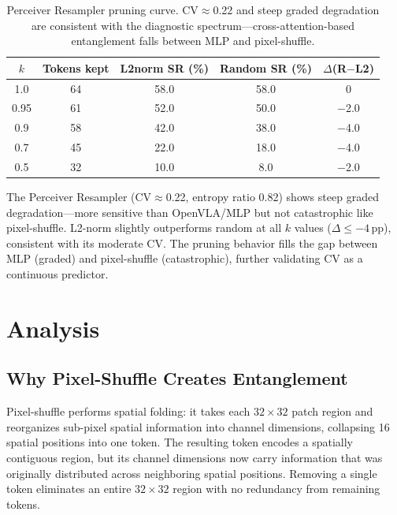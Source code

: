 \documentclass[10pt,letterpaper]{article}
\newcommand{\pp}{\,\text{pp}}
\begin{document}
\begin{table}[t]
\centering
\caption{Perceiver Resampler pruning curve. CV$\approx$0.22 and steep graded degradation are consistent with the diagnostic spectrum---cross-attention-based entanglement falls between MLP and pixel-shuffle.}
\label{tab:perceiver}
\small
\begin{tabular}{ccccc}
\toprule
$k$ & Tokens kept & L2norm SR (\%) & Random SR (\%) & $\Delta$(R$-$L2) \\
\midrule
1.0 & 64 & 58.0 & 58.0 & 0 \\
0.95 & 61 & 52.0 & 50.0 & $-$2.0 \\
0.9 & 58 & 42.0 & 38.0 & $-$4.0 \\
0.7 & 45 & 22.0 & 18.0 & $-$4.0 \\
0.5 & 32 & 10.0 & 8.0 & $-$2.0 \\
\bottomrule
\end{tabular}
\end{table}

The Perceiver Resampler (CV$\approx$0.22, entropy ratio 0.82) shows steep graded degradation---more sensitive than OpenVLA/MLP but not catastrophic like pixel-shuffle. L2-norm slightly outperforms random at all $k$ values ($\Delta \leq -4\pp$), consistent with its moderate CV. The pruning behavior fills the gap between MLP (graded) and pixel-shuffle (catastrophic), further validating CV as a continuous predictor.


\section{Analysis}
\label{sec:analysis}


\subsection{Why Pixel-Shuffle Creates Entanglement}
\label{sec:why_entanglement}

Pixel-shuffle performs spatial folding: it takes each $32 \times 32$ patch region and reorganizes sub-pixel spatial information into channel dimensions, collapsing 16 spatial positions into one token. The resulting token encodes a spatially contiguous region, but its channel dimensions now carry information that was originally distributed across neighboring spatial positions. Removing a single token eliminates an entire $32 \times 32$ region with no redundancy from remaining tokens.
\end{document}
